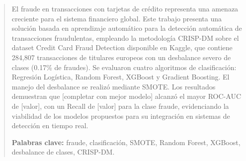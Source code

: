 \begin{abstract}
El fraude en transacciones con tarjetas de crédito representa una amenaza
creciente para el sistema financiero global. Este trabajo presenta una
solución basada en aprendizaje automático para la detección automática de
transacciones fraudulentas, empleando la metodología CRISP-DM sobre el
dataset Credit Card Fraud Detection disponible en Kaggle, que contiene
284,807 transacciones de titulares europeos con un desbalance severo de
clases (0.17\% de fraudes). Se evaluaron cuatro algoritmos de
clasificación: Regresión Logística, Random Forest, XGBoost y Gradient
Boosting. El manejo del desbalance se realizó mediante SMOTE. Los
resultados demuestran que [completar con mejor modelo] alcanzó el mayor
ROC-AUC de [valor], con un Recall de [valor] para la clase fraude,
evidenciando la viabilidad de los modelos propuestos para su integración
en sistemas de detección en tiempo real.

\textbf{Palabras clave:} fraude, clasificación, SMOTE, Random Forest,
XGBoost, desbalance de clases, CRISP-DM.
\end{abstract}

